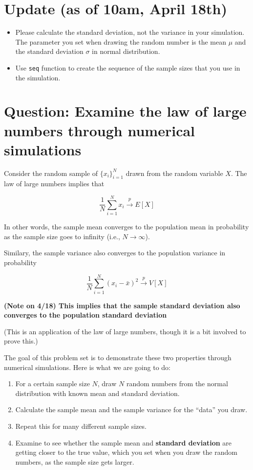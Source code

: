 \documentclass[]{book}
\providecommand{\tightlist}{%
  \setlength{\itemsep}{0pt}\setlength{\parskip}{0pt}}
\begin{document}
\hypertarget{update-as-of-10am-april-18th}{%
\section{Update (as of 10am, April 18th)}\label{update-as-of-10am-april-18th}}

\begin{itemize}
\tightlist
\item
  Please calculate the standard deviation, not the variance in your simulation. The parameter you set when drawing the random number is the mean \(\mu\) and the standard deviation \(\sigma\) in normal distribution.
\item
  Use \texttt{seq} function to create the sequence of the sample sizes that you use in the simulation.
\end{itemize}

\hypertarget{question-examine-the-law-of-large-numbers-through-numerical-simulations}{%
\section{Question: Examine the law of large numbers through numerical simulations}\label{question-examine-the-law-of-large-numbers-through-numerical-simulations}}

Consider the random sample of \(\{x_{i}\}_{i=1}^{N}\) drawn from the random variable \(X\). The law of large numbers implies that

\[
\frac{1}{N}\sum_{i=1}^{N}x_{i}\overset{p}{\longrightarrow}E[X]
\]

In other words, the sample mean converges to the population mean in probability as the sample size goes to infinity (i.e., \(N \rightarrow \infty\)).

Similary, the sample variance also converges to the population variance in probability

\[
\frac{1}{N}\sum_{i=1}^{N}(x_{i}-\bar{x})^{2}\overset{p}{\longrightarrow}V[X]
\]

\textbf{(Note on 4/18) This implies that the sample standard deviation also converges to the population standard deviation}

(This is an application of the law of large numbers, though it is a bit involved to prove this.)

The goal of this problem set is to demonstrate these two properties through numerical simulations.
Here is what we are going to do:

\begin{enumerate}
\def\labelenumi{\arabic{enumi}.}
\tightlist
\item
  For a certain sample size \(N\), draw \(N\) random numbers from the normal distribution with known mean and standard deviation.
\item
  Calculate the sample mean and the sample variance for the ``data'' you draw.
\item
  Repeat this for many different sample sizes.
\item
  Examine to see whether the sample mean and \textbf{standard deviation} are getting closer to the true value, which you set when you draw the random numbers, as the sample size gets larger.
\end{enumerate}
\end{document}
